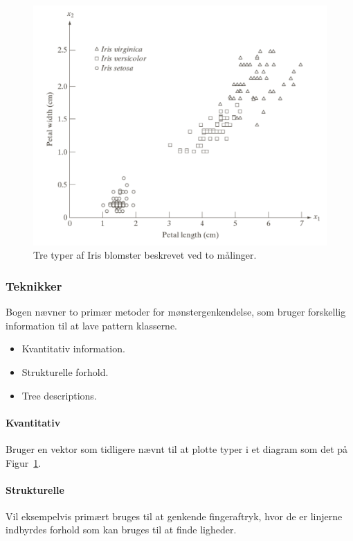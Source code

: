 \begin{figure}[H]
	\centering
	\includegraphics[width=0.9\linewidth]{figs/spm12/iris-graph}
	\caption{Tre typer af Iris blomster beskrevet ved to målinger.}
	\label{fig:iris-graph}
\end{figure}

\subsubsection{Teknikker}

Bogen nævner to primær metoder for mønstergenkendelse, som bruger forskellig information til at lave pattern klasserne.  

\begin{itemize}
	\item Kvantitativ information.
	\item Strukturelle forhold.
	\item Tree descriptions.
\end{itemize}

\paragraph{Kvantitativ}

Bruger en vektor som tidligere nævnt til at plotte typer i et diagram som det på Figur~\ref{fig:iris-graph}.

\paragraph{Strukturelle}

Vil eksempelvis primært bruges til at genkende fingeraftryk, hvor de er linjerne indbyrdes forhold som kan bruges til at finde ligheder.

